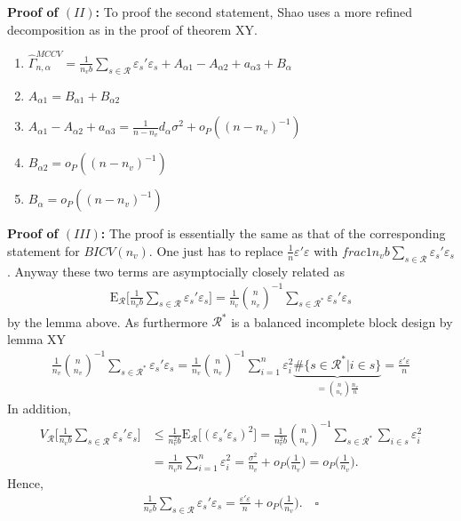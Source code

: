 \documentclass[Research_Module_ES.tex]{subfiles}
\begin{document}
\textbf{Proof of $(II)$:}
To proof the second statement, Shao uses a more refined decomposition as in the proof of theorem XY. 
\begin{enumerate}
\item  $\hat{\Gamma}_{n,\alpha}^{MCCV} = \frac{1}{n_vb}\sum_{s\in \mathcal{R}}\varepsilon_s'\varepsilon_s+ A_{\alpha1}-A_{\alpha2}+a_{\alpha3}+B_\alpha$
\item $A_{\alpha1} = B_{\alpha1}+ B_{\alpha2}$
\item $ A_{\alpha1}-A_{\alpha2}+a_{\alpha3} = \frac{1}{n-n_v}d_\alpha\sigma^2 + o_P((n-n_v)^{-1})$
\item $B_{\alpha2} = o_P((n-n_v)^{-1})$
\item $B_{\alpha} = o_P((n-n_v)^{-1})$
\end{enumerate}

\textbf{Proof of $(III)$:} 
The proof is essentially the same as that of the corresponding statement for $BICV(n_v)$. One just has to replace $\frac{1}{n}\varepsilon'\varepsilon$ with $frac{1}{n_vb}\sum_{s\in \mathcal{R}}\varepsilon_s'\varepsilon_s$. Anyway these two terms are asymptocially closely related as
\begin{align*}
\mathrm{E}_\mathcal{R} \biggl[ \frac{1}{n_vb}\sum_{s\in \mathcal{R}}\varepsilon_s'\varepsilon_s\biggr] 
=\frac{1}{n_v}\binom{n}{n_v}^{-1}\sum_{s\in \mathcal{R}^\ast}\varepsilon_s'\varepsilon_s
\end{align*}
by the lemma above. As furthermore $\mathcal{R}^\ast$ is a balanced incomplete block design by lemma XY 
\begin{align*}
\frac{1}{n_v}\binom{n}{n_v}^{-1}\sum_{s\in \mathcal{R}^\ast}\varepsilon_s'\varepsilon_s
= \frac{1}{n_v}\binom{n}{n_v}^{-1}\sum_{i=1}^n \varepsilon_i^2 \underbrace{\#\{s\in \mathcal{R}^\ast | i\in s\}}_{=\binom{n}{n_v}\frac{n_v}{n}}
= \frac{\varepsilon'\varepsilon}{n}
\end{align*}
In addition,
\begin{align*}
V_\mathcal{R} \biggl[ \frac{1}{n_vb}\sum_{s\in \mathcal{R}}\varepsilon_s'\varepsilon_s\biggr]
&\le \frac{1}{n_v^2b}\mathrm{E}_\mathcal{R} \bigl[(\varepsilon_s'\varepsilon_s)^2\bigr]
= \frac{1}{n_v^2b}\binom{n}{n_v}^{-1}\sum_{s\in \mathcal{R}^\ast}\sum_{i\in s} \varepsilon_i^2\\
&= \frac{1}{n_vn} \sum_{i=1}^n \varepsilon_i^2 
= \frac{\sigma^2}{n_v} + o_P\biggl(\frac{1}{n_v}\biggr)
= o_P\biggl(\frac{1}{n_v}\biggr).
\end{align*}
Hence, 
\begin{align*}
\frac{1}{n_vb}\sum_{s\in \mathcal{R}}\varepsilon_s'\varepsilon_s =\frac{\varepsilon'\varepsilon}{n} +o_P\biggl(\frac{1}{n_v}\biggr). \quad \square
\end{align*}
\end{document}
